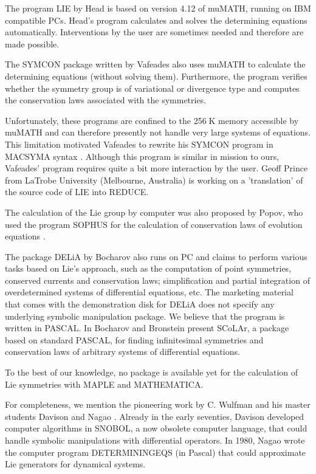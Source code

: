 \nopagebreak
The program LIE by Head \cite{headprogram} is based on version 4.12
of muMATH, running on IBM compatible PCs.
Head's program calculates and solves the determining equations
automatically. Interventions by the user are sometimes needed and
therefore are made possible.

\pagebreak
The SYMCON package written by Vafeades \cite{vafeadesprogram1} also uses
muMATH to calculate the determining equations (without solving them).
Furthermore, the program verifies whether the symmetry group is of variational
or divergence type and computes the conservation laws 
associated with the symmetries.

\nopagebreak
Unfortunately, these programs are confined to the
256$\;$K memory accessible by muMATH and can therefore presently not handle 
very large systems of equations. 
This limitation motivated Vafeades to rewrite his SYMCON program 
in MACSYMA syntax \cite{vafeadesprogram2}. Although this program is
similar in mission to ours, Vafeades' program requires quite a bit more
interaction by the user. 
Geoff Prince from LaTrobe University 
(Melbourne, Australia) is working on a 'translation' of
the source code of LIE into REDUCE.

\nopagebreak
The calculation of the Lie group by computer was also proposed
by Popov, who used the program SOPHUS for the calculation of conservation
laws of evolution equations
\cite{popovprogram}.

\nopagebreak
The package DELiA by Bocharov \cite{bocharovprogram} also runs 
on PC and claims to perform various tasks based on Lie's approach, such
as the computation of point symmetries, conserved currents and conservation
laws; simplification and partial integration of overdetermined systems
of differential equations, etc.
The marketing material that comes with the demonstration disk for DELiA 
does not specify any underlying symbolic manipulation package. 
We believe that the program is written in PASCAL.
In \cite{bocharovbronsteinprogram} Bocharov and Bronstein present 
SCoLAr, a package based on standard PASCAL, 
for finding infinitesimal symmetries 
and conservation laws of arbitrary systems of differential equations. 

\nopagebreak
To the best of our knowledge, no package is available yet for 
the calculation of Lie symmetries with MAPLE and MATHEMATICA.

\nopagebreak
For completeness, we mention the pioneering work by C. Wulfman and his 
master students Davison and Nagao \cite{wulfmanprogram1,wulfmanprogram2}. 
Already in the early seventies, 
Davison \cite{wulfmanprogram1} developed computer algorithms 
in SNOBOL, a now obsolete computer language, 
that could handle symbolic manipulations with differential operators. 
In 1980, Nagao \cite{wulfmanprogram2} wrote the computer program 
DETERMININGEQS (in Pascal) that could approximate Lie generators for 
dynamical systems. 

